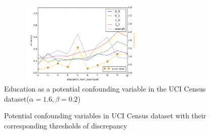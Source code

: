 \begin{figure}[htbp]
	\begin{center}
		\includegraphics[width=3.2in,height=1.6in]{education_disc.png} 
        \setlength{\belowcaptionskip}{-8pt} 
		\caption{Education as a potential confounding variable in the UCI Census dataset($\alpha=1.6, \beta=0.2$)}
		\label{edu_disc}
	\end{center}
\end{figure}

\begin{figure}[htbp]
\centering  
{}
\caption{Potential confounding variables in UCI Census dataset with their corresponding thresholds of discrepancy}
\label{all_disc}
\end{figure}



